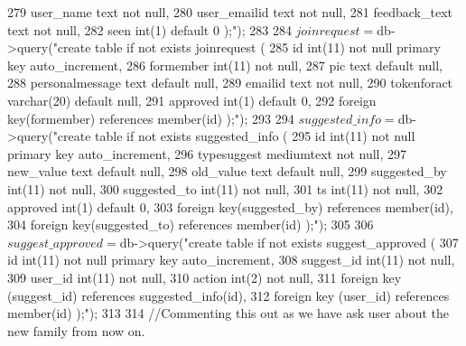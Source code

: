 \begin{DoxyCode}
279 \textcolor{stringliteral}{            user\_name text not null,}
280 \textcolor{stringliteral}{            user\_emailid text not null,}
281 \textcolor{stringliteral}{            feedback\_text text not null,}
282 \textcolor{stringliteral}{            seen int(1) default 0 );"});
283 
284         $joinrequest = $db->query(\textcolor{stringliteral}{"create table if not exists joinrequest (}
285 \textcolor{stringliteral}{            id int(11) not null primary key auto\_increment,}
286 \textcolor{stringliteral}{            formember int(11) not null,}
287 \textcolor{stringliteral}{            pic text default null,}
288 \textcolor{stringliteral}{            personalmessage text default null,}
289 \textcolor{stringliteral}{            emailid text not null,}
290 \textcolor{stringliteral}{            tokenforact varchar(20) default null,}
291 \textcolor{stringliteral}{            approved int(1) default 0,}
292 \textcolor{stringliteral}{            foreign key(formember) references member(id) );"});
293 
294         $suggested\_info = $db->query(\textcolor{stringliteral}{"create table if not exists suggested\_info (}
295 \textcolor{stringliteral}{            id int(11) not null primary key auto\_increment,}
296 \textcolor{stringliteral}{            typesuggest mediumtext not null,}
297 \textcolor{stringliteral}{            new\_value text default null,}
298 \textcolor{stringliteral}{            old\_value text default null,}
299 \textcolor{stringliteral}{            suggested\_by int(11) not null,}
300 \textcolor{stringliteral}{            suggested\_to int(11) not null,}
301 \textcolor{stringliteral}{            ts int(11) not null,}
302 \textcolor{stringliteral}{            approved int(1) default 0,}
303 \textcolor{stringliteral}{            foreign key(suggested\_by) references member(id),}
304 \textcolor{stringliteral}{            foreign key(suggested\_to) references member(id) );"});
305 
306         $suggest\_approved = $db->query(\textcolor{stringliteral}{"create table if not exists suggest\_approved (}
307 \textcolor{stringliteral}{            id int(11) not null primary key auto\_increment,}
308 \textcolor{stringliteral}{            suggest\_id int(11) not null,}
309 \textcolor{stringliteral}{            user\_id int(11) not null,}
310 \textcolor{stringliteral}{            action int(2) not null,}
311 \textcolor{stringliteral}{            foreign key (suggest\_id) references suggested\_info(id),}
312 \textcolor{stringliteral}{            foreign key (user\_id) references member(id) );"});
313 
314         \textcolor{comment}{//Commenting this out as we have ask user about the new family from now on.}

\end{DoxyCode}

